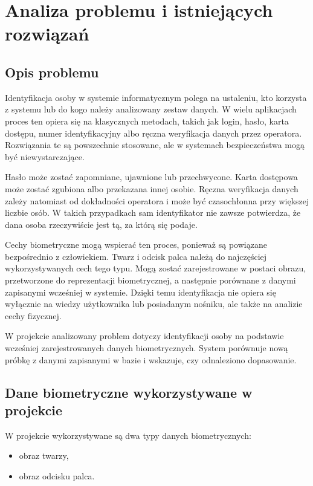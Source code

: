 \chapter{Analiza problemu i istniejących rozwiązań}
\label{chap:analiza-problemu}

\section{Opis problemu}

Identyfikacja osoby w systemie informatycznym polega na ustaleniu, kto korzysta z systemu lub do kogo należy analizowany zestaw danych. W wielu aplikacjach proces ten opiera się na klasycznych metodach, takich jak login, hasło, karta dostępu, numer identyfikacyjny albo ręczna weryfikacja danych przez operatora. Rozwiązania te są powszechnie stosowane, ale w systemach bezpieczeństwa mogą być niewystarczające.

Hasło może zostać zapomniane, ujawnione lub przechwycone. Karta dostępowa może zostać zgubiona albo przekazana innej osobie. Ręczna weryfikacja danych zależy natomiast od dokładności operatora i może być czasochłonna przy większej liczbie osób. W takich przypadkach sam identyfikator nie zawsze potwierdza, że dana osoba rzeczywiście jest tą, za którą się podaje.

Cechy biometryczne mogą wspierać ten proces, ponieważ są powiązane bezpośrednio z człowiekiem. Twarz i odcisk palca należą do najczęściej wykorzystywanych cech tego typu. Mogą zostać zarejestrowane w postaci obrazu, przetworzone do reprezentacji biometrycznej, a następnie porównane z danymi zapisanymi wcześniej w systemie. Dzięki temu identyfikacja nie opiera się wyłącznie na wiedzy użytkownika lub posiadanym nośniku, ale także na analizie cechy fizycznej.

W projekcie analizowany problem dotyczy identyfikacji osoby na podstawie wcześniej zarejestrowanych danych biometrycznych. System porównuje nową próbkę z danymi zapisanymi w bazie i wskazuje, czy odnaleziono dopasowanie.

\section{Dane biometryczne wykorzystywane w projekcie}

W projekcie wykorzystywane są dwa typy danych biometrycznych:
\begin{itemize}
    \item obraz twarzy,
    \item obraz odcisku palca.
\end{itemize}

